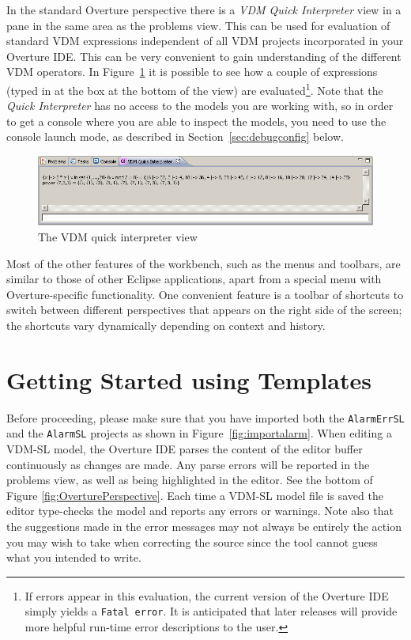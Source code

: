 In the standard Overture perspective there is a \emph{VDM Quick Interpreter} view in a pane in the same area as the problems view. This can be used for evaluation of standard VDM expressions independent of all VDM projects incorporated in your Overture IDE. This can be very convenient to gain understanding of the
different VDM operators. In Figure~\ref{fig:QuickIntView} it is possible to see how a couple of expressions (typed in at the box at the bottom of the view) are evaluated\footnote{If errors appear in this evaluation, the current version of the Overture IDE simply yields a \texttt{Fatal error}.  It is anticipated that later releases will provide more helpful run-time error descriptions to the user.}. Note that the \emph{Quick Interpreter} has no access to the models you are working with, so in order to get a console where you are able to inspect the models, you need to use the console launch mode, as described in Section~\ref{sec:debugconfig} below. 
%
\begin{figure}[!htb]
\begin{center}
  \includegraphics[width=4.5in]{figures/quickinterpreter}
  \caption[labelInTOC]{The VDM quick interpreter view}
  \label{fig:QuickIntView}
\end{center}
\end{figure}
%
Most of the other features of the workbench, such as the menus and toolbars, are similar to those of other Eclipse applications, apart from a special menu with Overture-specific functionality. One convenient feature is a toolbar of shortcuts to switch between different perspectives that appears on the right side of the screen; the shortcuts vary dynamically depending on context and history.
%
\section{Getting Started using Templates}\label{sec:templates}
Before proceeding, please make sure that you have imported both the \texttt{AlarmErrSL} and the \texttt{AlarmSL} projects as shown in Figure~\ref{fig:importalarm}. 
When editing a VDM-SL model, the Overture IDE parses the content of the editor buffer continuously as changes are made. Any parse errors will be reported in the problems view, as well as being highlighted in the editor. See the bottom of Figure \ref{fig:OverturePerspective}. Each time a VDM-SL model file is
saved the editor type-checks the model and reports any errors or warnings. Note also that the suggestions made in the error messages may not always be entirely the action you may wish to take when
correcting the source since the tool cannot guess what you intended to write.


